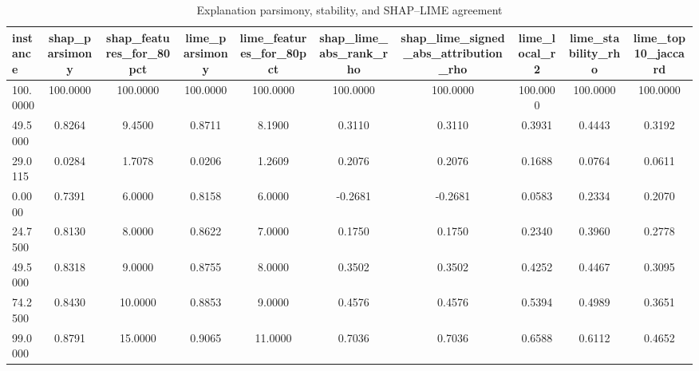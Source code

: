 \begin{table}
\centering
\caption{Explanation parsimony, stability, and SHAP--LIME agreement}
\label{tab:explanation_quality}
\begin{tabular}{lccccccccc}
\toprule
instance & shap_parsimony & shap_features_for_80pct & lime_parsimony & lime_features_for_80pct & shap_lime_abs_rank_rho & shap_lime_signed_abs_attribution_rho & lime_local_r2 & lime_stability_rho & lime_top10_jaccard \\
\midrule
100.0000 & 100.0000 & 100.0000 & 100.0000 & 100.0000 & 100.0000 & 100.0000 & 100.0000 & 100.0000 & 100.0000 \\
49.5000 & 0.8264 & 9.4500 & 0.8711 & 8.1900 & 0.3110 & 0.3110 & 0.3931 & 0.4443 & 0.3192 \\
29.0115 & 0.0284 & 1.7078 & 0.0206 & 1.2609 & 0.2076 & 0.2076 & 0.1688 & 0.0764 & 0.0611 \\
0.0000 & 0.7391 & 6.0000 & 0.8158 & 6.0000 & -0.2681 & -0.2681 & 0.0583 & 0.2334 & 0.2070 \\
24.7500 & 0.8130 & 8.0000 & 0.8622 & 7.0000 & 0.1750 & 0.1750 & 0.2340 & 0.3960 & 0.2778 \\
49.5000 & 0.8318 & 9.0000 & 0.8755 & 8.0000 & 0.3502 & 0.3502 & 0.4252 & 0.4467 & 0.3095 \\
74.2500 & 0.8430 & 10.0000 & 0.8853 & 9.0000 & 0.4576 & 0.4576 & 0.5394 & 0.4989 & 0.3651 \\
99.0000 & 0.8791 & 15.0000 & 0.9065 & 11.0000 & 0.7036 & 0.7036 & 0.6588 & 0.6112 & 0.4652 \\
\bottomrule
\end{tabular}
\end{table}
